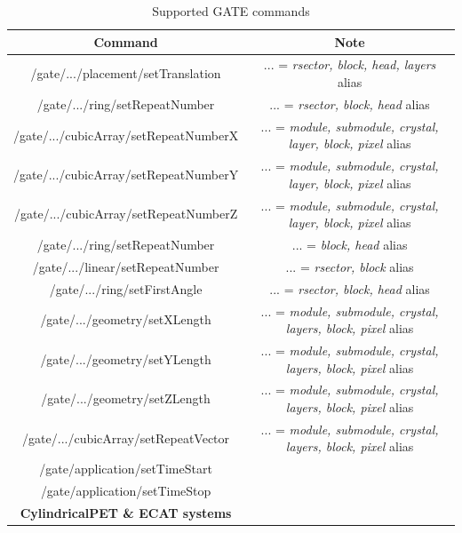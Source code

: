\documentclass[a4paper, 11pt]{article}
\begin{document}
\begin{table} [h!]
  \small
  \caption{Supported GATE commands}
  \label{table_GATE_commands}
  \begin{center}
  \begin{tabular}{|c|c|}
  \hline
  \cellcolor{blue!25} \textbf{Command} & \cellcolor{blue!25} \textbf{Note} \\
  \hline
  \hline
  /gate/.../placement/setTranslation & ... = \textit{rsector, block, head, layers} alias  \\ \hline
  /gate/.../ring/setRepeatNumber & ... = \textit{rsector, block, head} alias  \\ \hline
  /gate/.../cubicArray/setRepeatNumberX & ... = \textit{module, submodule, crystal, layer, block, pixel} alias  \\ \hline
  /gate/.../cubicArray/setRepeatNumberY & ... = \textit{module, submodule, crystal, layer, block, pixel} alias  \\ \hline
  /gate/.../cubicArray/setRepeatNumberZ & ... = \textit{module, submodule, crystal, layer, block, pixel} alias  \\ \hline

  /gate/.../ring/setRepeatNumber & ... = \textit{block, head} alias  \\ \hline
  /gate/.../linear/setRepeatNumber & ... = \textit{rsector, block} alias  \\ \hline

  /gate/.../ring/setFirstAngle & ... = \textit{rsector, block, head} alias  \\ \hline
  /gate/.../geometry/setXLength & ... = \textit{module, submodule, crystal, layers, block, pixel} alias  \\ \hline
  /gate/.../geometry/setYLength & ... = \textit{module, submodule, crystal, layers, block, pixel} alias  \\ \hline
  /gate/.../geometry/setZLength & ... = \textit{module, submodule, crystal, layers, block, pixel} alias  \\ \hline
  /gate/.../cubicArray/setRepeatVector & ... = \textit{module, submodule, crystal, layers, block, pixel} alias  \\ \hline

  /gate/application/setTimeStart &  \\ \hline
  /gate/application/setTimeStop &  \\ \hline

  \cellcolor{blue!25}\textbf{CylindricalPET \& ECAT systems}& \cellcolor{blue!25} \\ \hline
  

\end{tabular}
\end{center}
\end{table}
\end{document}
